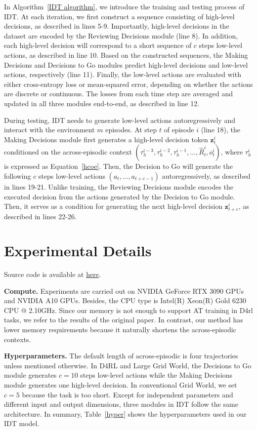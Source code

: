 In Algorithm~\ref{IDT algorithm}, we introduce the training and testing process of IDT. At each iteration, we first construct a sequence consisting of high-level decisions, as described in lines 5-9. Importantly, high-level decisions in the dataset are encoded by the Reviewing Decisions module (line 8). In addition, each high-level decision will correspond to a short sequence of $c$ steps low-level actions, as described in line 10. Based on the constructed sequences, the Making Decisions and Decisions to Go modules predict high-level decisions and low-level actions, respectively (line 11). Finally, the low-level actions are evaluated with either cross-entropy loss or mean-squared error, depending on whether the actions are discrete or continuous. The losses from each time step are averaged and updated in all three modules end-to-end, as described in line 12.

During testing, IDT needs to generate low-level actions autoregressively and interact with the environment $m$ episodes. At step $t$ of episode $i$ (line 18), the Making Decisions module first generates a high-level decision token $\textbf{z}_t^i$ conditioned on the across-episodic context $(\tau_h^{i-3},\tau_h^{i-2},\tau_h^{i-1},\dots,\hat{R}_t^i,o_t^i)$, where $\tau_h^{i}$ is expressed as Equation~\eqref{hcoe}. Then, the Decision to Go will generate the following $c$ steps low-level actions $(a_t,\dots,a_{t+c-1})$ autoregressively, as described in lines 19-21. Unlike training, the Reviewing Decisions module encodes the executed decision from the actions generated by the Decision to Go module. Then, it serves as a condition for generating the next high-level decision $\textbf{z}_{t+c}^i$, as described in lines 22-26.

\section{Experimental Details}
\label{appendix B}

Source code is available at \href{https://github.com/SiliHuang-ai/IDT}{here}.

\noindent\textbf{Compute.}
Experiments are carried out on NVIDIA GeForce RTX 3090 GPUs and NVIDIA A10 GPUs.
Besides, the CPU type is Intel(R) Xeon(R) Gold 6230 CPU @ 2.10GHz.
Since our memory is not enough to support AT training in D4rl tasks, we refer to the results of the original paper. In contrast, our method has lower memory requirements because it naturally shortens the across-episodic contexts.

\noindent\textbf{Hyperparameters.}
The default length of across-episodic is four trajectories unless mentioned otherwise. In D4RL and Large Grid World, the Decisions to Go module generates $c=10$ steps low-level actions while the Making Decisions module generates one high-level decision. In conventional Grid World, we set $c=5$ because the task is too short. Except for independent parameters and different input and output dimensions, three modules in IDT follow the same architecture. In summary, Table~\ref{hyper} shows the hyperparameters used in our IDT model.

